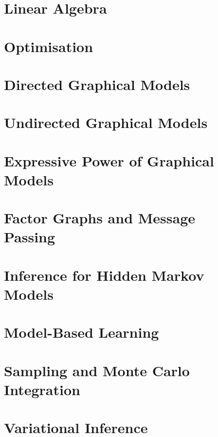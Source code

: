 \documentclass[11pt,a4paper,twoside,openright]{book}
\let\origdoublepage\cleardoublepage
\newcommand{\clearemptydoublepage}{%
  \clearpage
  {\pagestyle{empty}\origdoublepage}%
}
\let\cleardoublepage\clearemptydoublepage
\begin{document}
\frontmatter


\newpage


\dominitoc
\setcounter{tocdepth}{1}    %
\setcounter{secnumdepth}{1} %
\tableofcontents
\cleardoublepage



\mainmatter

\chapter{Linear Algebra}
\minitoc
 

\chapter{Optimisation} 
\minitoc
 

\chapter{Directed Graphical Models} 
\minitoc
 

\chapter{Undirected Graphical Models}
\minitoc
 

\chapter{Expressive Power of Graphical Models} 
\minitoc
 

\chapter{Factor Graphs and Message Passing} 
\minitoc
 

\chapter{Inference for Hidden Markov Models}
\minitoc
 

\chapter{Model-Based Learning} 
\minitoc


\chapter{Sampling and Monte Carlo Integration}
\minitoc


\chapter{Variational Inference}
\minitoc



\end{document}
